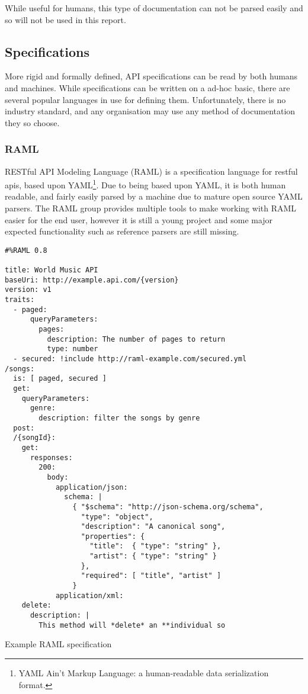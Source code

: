 While useful for humans, this type of documentation can not be parsed easily and so will not be used in this report.

\subsection{Specifications}

More rigid and formally defined, API specifications can be read by both humans and machines. While specifications can be written on a ad-hoc basic, there are several popular languages in use for defining them. Unfortunately, there is no industry standard, and any organisation may use any method of documentation they so choose.

\subsubsection{RAML}

RESTful API Modeling Language (RAML)\cite{ramlwebsite} is a specification language for restful apis, based upon YAML\footnote{YAML Ain't Markup Language: a human-readable data serialization format.}\cite{yamlspec}. Due to being based upon YAML, it is both human readable, and fairly easily parsed by a machine due to mature open source YAML parsers. The RAML group provides multiple tools to make working with RAML easier for the end user, however it is still a young project and some major expected functionality such as reference parsers are still missing.

\begin{code}
\begin{verbatim}
#%RAML 0.8
 
title: World Music API
baseUri: http://example.api.com/{version}
version: v1
traits:
  - paged:
      queryParameters:
        pages:
          description: The number of pages to return
          type: number
  - secured: !include http://raml-example.com/secured.yml
/songs:
  is: [ paged, secured ]
  get:
    queryParameters:
      genre:
        description: filter the songs by genre
  post:
  /{songId}:
    get:
      responses:
        200:
          body:
            application/json:
              schema: |
                { "$schema": "http://json-schema.org/schema",
                  "type": "object",
                  "description": "A canonical song",
                  "properties": {
                    "title":  { "type": "string" },
                    "artist": { "type": "string" }
                  },
                  "required": [ "title", "artist" ]
                }
            application/xml:
    delete:
      description: |
        This method will *delete* an **individual so
\end{verbatim}
\caption{Example RAML specification}
\label{lst:my_func}
\end{code}

